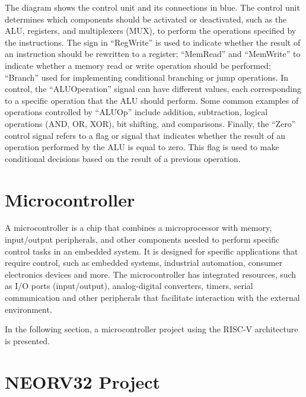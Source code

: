         The diagram shows the control unit and its connections in blue. The control unit determines which components should be activated or deactivated, such as the ALU, registers, and multiplexers (MUX), to perform the operations specified by the instructions. The sign in ``RegWrite'' is used to indicate whether the result of an instruction should be rewritten to a register; ``MemRead'' and ``MemWrite'' to indicate whether a memory read or write operation should be performed; ``Branch'' used for implementing conditional branching or jump operations. In control, the ``ALUOperation'' signal can have different values, each corresponding to a specific operation that the ALU should perform. Some common examples of operations controlled by ``ALUOp'' include addition, subtraction, logical operations (AND, OR, XOR), bit shifting, and comparisons. Finally, the ``Zero'' control signal refers to a flag or signal that indicates whether the result of an operation performed by the ALU is equal to zero. This flag is used to make conditional decisions based on the result of a previous operation.
    
    \section{Microcontroller} \label{sec:section_riscv_stud.2}
    
        A microcontroller is a chip that combines a microprocessor with memory, input/output peripherals, and other components needed to perform specific control tasks in an embedded system. It is designed for specific applications that require control, such as embedded systems, industrial automation, consumer electronics devices and more. The microcontroller has integrated resources, such as I/O ports (input/output), analog-digital converters, timers, serial communication and other peripherals that facilitate interaction with the external environment.
        
        In the following section, a microcontroller project using the RISC-V architecture is presented.
        
    
    
    \section{NEORV32 Project} \label{sec:section_riscv_stud.3}
    
